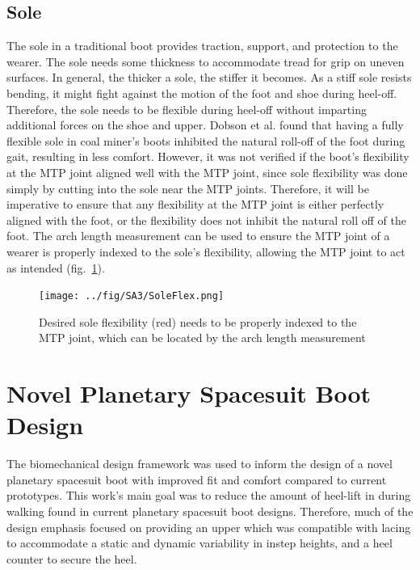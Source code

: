 \documentclass[defaultstyle,11pt]{comps}
\begin{document}
\hypertarget{sole}{%
\subsection{Sole}\label{sole}}

The sole in a traditional boot provides traction, support, and protection to the wearer.
The sole needs some thickness to accommodate tread for grip on uneven surfaces.
In general, the thicker a sole, the stiffer it becomes.
As a stiff sole resists bending, it might fight against the motion of the foot and shoe during heel-off.
Therefore, the sole needs to be flexible during heel-off without imparting additional forces on the shoe and upper.
Dobson et al. \citep{Dobson2020} found that having a fully flexible sole in coal miner's boots inhibited the natural roll-off of the foot during gait, resulting in less comfort.
However, it was not verified if the boot's flexibility at the MTP joint aligned well with the MTP joint, since sole flexibility was done simply by cutting into the sole near the MTP joints.
Therefore, it will be imperative to ensure that any flexibility at the MTP joint is either perfectly aligned with the foot, or the flexibility does not inhibit the natural roll off of the foot.
The arch length measurement can be used to ensure the MTP joint of a wearer is properly indexed to the sole's flexibility, allowing the MTP joint to act as intended (fig.~\ref{fig:SA3-SoleFlex}).

\begin{figure}
\hypertarget{fig:SA3-SoleFlex}{%
\centering
\texttt{[image: ../fig/SA3/SoleFlex.png]}
\caption{Desired sole flexibility (red) needs to be properly indexed to the MTP joint, which can be located by the arch length measurement}\label{fig:SA3-SoleFlex}
}
\end{figure}

\hypertarget{novel-planetary-spacesuit-boot-design}{%
\section{Novel Planetary Spacesuit Boot Design}\label{novel-planetary-spacesuit-boot-design}}

The biomechanical design framework was used to inform the design of a novel planetary spacesuit boot with improved fit and comfort compared to current prototypes.
This work's main goal was to reduce the amount of heel-lift in during walking found in current planetary spacesuit boot designs.
Therefore, much of the design emphasis focused on providing an upper which was compatible with lacing to accommodate a static and dynamic variability in instep heights, and a heel counter to secure the heel.
\end{document}
